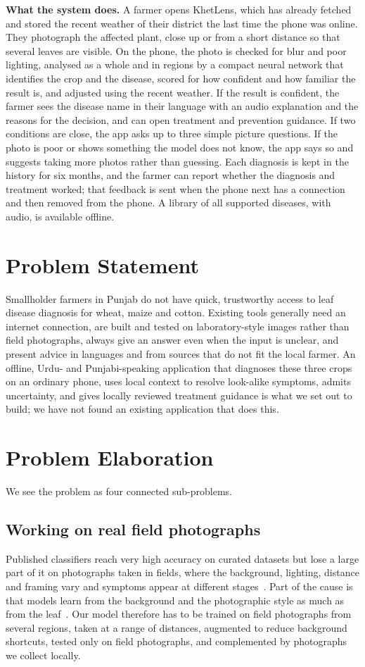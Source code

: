 \textbf{What the system does.} A farmer opens KhetLens, which has already fetched and stored the recent weather of their district the last time the phone was online. They photograph the affected plant, close up or from a short distance so that several leaves are visible. On the phone, the photo is checked for blur and poor lighting, analysed as a whole and in regions by a compact neural network that identifies the crop and the disease, scored for how confident and how familiar the result is, and adjusted using the recent weather. If the result is confident, the farmer sees the disease name in their language with an audio explanation and the reasons for the decision, and can open treatment and prevention guidance. If two conditions are close, the app asks up to three simple picture questions. If the photo is poor or shows something the model does not know, the app says so and suggests taking more photos rather than guessing. Each diagnosis is kept in the history for six months, and the farmer can report whether the diagnosis and treatment worked; that feedback is sent when the phone next has a connection and then removed from the phone. A library of all supported diseases, with audio, is available offline.

\section{Problem Statement}
Smallholder farmers in Punjab do not have quick, trustworthy access to leaf disease diagnosis for wheat, maize and cotton. Existing tools generally need an internet connection, are built and tested on laboratory-style images rather than field photographs, always give an answer even when the input is unclear, and present advice in languages and from sources that do not fit the local farmer. An offline, Urdu- and Punjabi-speaking application that diagnoses these three crops on an ordinary phone, uses local context to resolve look-alike symptoms, admits uncertainty, and gives locally reviewed treatment guidance is what we set out to build; we have not found an existing application that does this.

\section{Problem Elaboration}
We see the problem as four connected sub-problems.

\subsection{Working on real field photographs}
Published classifiers reach very high accuracy on curated datasets but lose a large part of it on photographs taken in fields, where the background, lighting, distance and framing vary and symptoms appear at different stages~\cite{mohanty2016,singh2020plantdoc}. Part of the cause is that models learn from the background and the photographic style as much as from the leaf~\cite{noyan2022bias}. Our model therefore has to be trained on field photographs from several regions, taken at a range of distances, augmented to reduce background shortcuts, tested only on field photographs, and complemented by photographs we collect locally.

